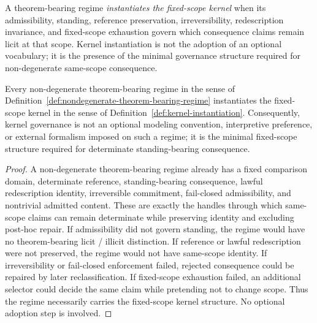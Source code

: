 \begin{manualdefinition}
\label{def:kernel-instantiation}
A theorem-bearing regime \emph{instantiates the fixed-scope kernel} when its admissibility, standing, reference preservation, irreversibility, redescription invariance, and fixed-scope exhaustion govern which consequence claims remain licit at that scope. Kernel instantiation is not the adoption of an optional vocabulary; it is the presence of the minimal governance structure required for non-degenerate same-scope consequence.
\end{manualdefinition}

\begin{manualtheorem}
\label{thm:kernel-necessity-nondegenerate-regimes}
Every non-degenerate theorem-bearing regime in the sense of Definition~\ref{def:nondegenerate-theorem-bearing-regime} instantiates the fixed-scope kernel in the sense of Definition~\ref{def:kernel-instantiation}. Consequently, kernel governance is not an optional modeling convention, interpretive preference, or external formalism imposed on such a regime; it is the minimal fixed-scope structure required for determinate standing-bearing consequence.
\end{manualtheorem}

\begin{proof}
A non-degenerate theorem-bearing regime already has a fixed comparison domain, determinate reference, standing-bearing consequence, lawful redescription identity, irreversible commitment, fail-closed admissibility, and nontrivial admitted content. These are exactly the handles through which same-scope claims can remain determinate while preserving identity and excluding post-hoc repair. If admissibility did not govern standing, the regime would have no theorem-bearing licit / illicit distinction. If reference or lawful redescription were not preserved, the regime would not have same-scope identity. If irreversibility or fail-closed enforcement failed, rejected consequence could be repaired by later reclassification. If fixed-scope exhaustion failed, an additional selector could decide the same claim while pretending not to change scope. Thus the regime necessarily carries the fixed-scope kernel structure. No optional adoption step is involved.
\end{proof}


